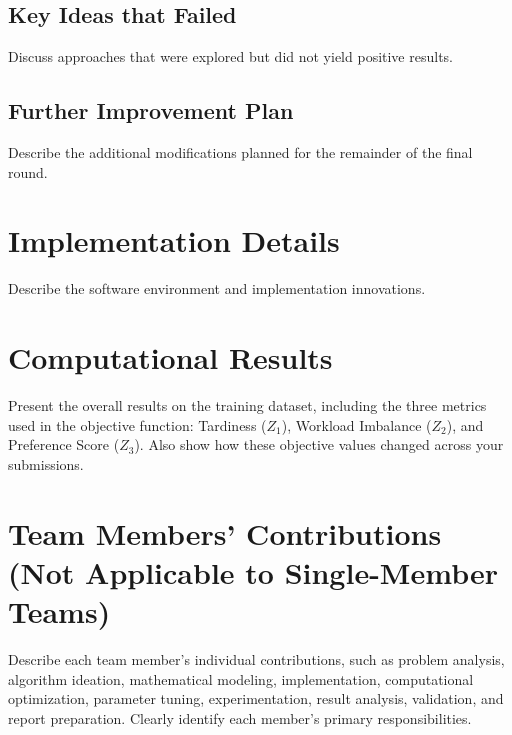 \documentclass[runningheads]{llncs}
\begin{document}
\subsection{Key Ideas that Failed}
\begin{guidance}
Discuss approaches that were explored but did not yield positive results.
\end{guidance}

\subsection{Further Improvement Plan}
\begin{guidance}
Describe the additional modifications planned for the remainder of the final
round. 
\end{guidance}

\section{Implementation Details}
\label{sec:implementation}

\begin{guidance}
Describe the software environment and implementation innovations. 

\end{guidance}

\section{Computational Results}



\begin{guidance}
Present the overall results on the training dataset, including the three metrics used in the objective function: Tardiness ($Z_1$), Workload Imbalance ($Z_2$), and Preference Score ($Z_3$). 
Also show how these objective values changed across your submissions.
\end{guidance}

\newpage


\section{Team Members' Contributions\\ (Not Applicable to Single-Member Teams)}
\begin{guidance}
Describe each team member's individual contributions, such as problem
analysis, algorithm ideation, mathematical modeling, implementation,
computational optimization, parameter tuning, experimentation, result
analysis, validation, and report preparation. Clearly identify each
member's primary responsibilities.
\end{guidance}
\end{document}
